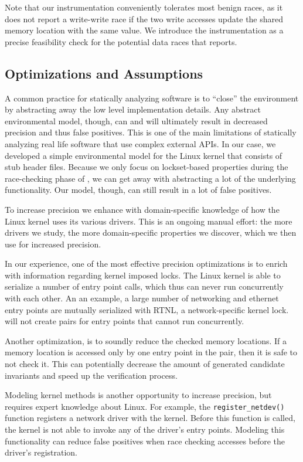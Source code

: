 Note that our instrumentation conveniently tolerates most benign races, as it
does not report a write-write race if the two write accesses update the shared
memory location with the same value.  We introduce the instrumentation as a
precise feasibility check for the potential data races that \whoop reports.

\subsection{Optimizations and Assumptions}
\label{whoop:optimizations}

A common practice for statically analyzing software is to ``close'' the environment by abstracting away the low level implementation details. Any abstract environmental model, though, can and will ultimately result in decreased precision and thus false positives. This is one of the main limitations of statically analyzing real life software that use complex external APIs. In our case, we developed a simple environmental model for the Linux kernel that consists of stub header files. Because we only focus on lockset-based properties during the race-checking phase of \whoop, we can get away with abstracting a lot of the underlying functionality. Our model, though, can still result in a lot of false positives.

To increase precision we enhance \whoop with domain-specific knowledge of how the Linux kernel uses its various drivers. This is an ongoing manual effort: the more drivers we study, the more domain-specific properties we discover, which we then use for increased precision.

In our experience, one of the most effective precision optimizations is to enrich \whoop with information regarding kernel imposed locks. The Linux kernel is able to serialize a number of entry point calls, which thus can never run concurrently with each other. An an example, a large number of networking and ethernet entry points are mutually serialized with RTNL, a network-specific kernel lock. \whoop will not create pairs for entry points that cannot run concurrently.

Another optimization, is to soundly reduce the checked memory locations. If a memory location is accessed only by one entry point in the pair, then it is safe to not check it. This can potentially decrease the amount of generated candidate invariants and speed up the verification process.

Modeling kernel methods is another opportunity to increase precision, but requires expert knowledge about Linux. For example, the \texttt{register\_netdev()} function registers a network driver with the kernel. Before this function is called, the kernel is not able to invoke any of the driver's entry points. Modeling this functionality can reduce false positives when race checking accesses before the driver's registration.


